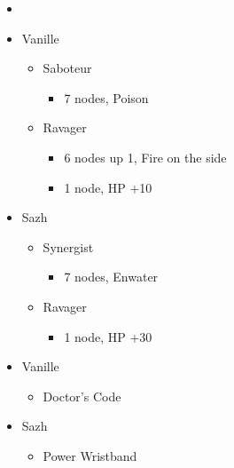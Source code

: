 \begin{menu}
\begin{multicols}{2}
\begin{itemize}
    \paradigm
    \begin{itemize}
        \item {}%
{\paradigmline{\rav}{\com}{}}%
{\paradigmline[2]{\textit{(\sab)}}{\textit{(\syn)}}{}}%
{\paradigmline{\sab}{\syn}{}}%
{\paradigmline{\rav}{\rav}{}}%
{\paradigmline{[\sab]}{(\rav)}{}}%
{\paradigmline{[\sab]}{\com}{}}
    \end{itemize}
    \columnbreak
    \crystarium
    \begin{itemize}
        \item Vanille
        \begin{itemize}
            \item Saboteur
            \begin{itemize}
                \item 7 nodes, Poison
            \end{itemize}
            \item Ravager
            \begin{itemize}
                \item 6 nodes up 1, Fire on the side
                \item 1 node, HP +10
            \end{itemize}
        \end{itemize}
        \item Sazh
        \begin{itemize}
            \item Synergist
            \begin{itemize}
                \item 7 nodes, Enwater
            \end{itemize}
            \item Ravager
            \begin{itemize}
                \item 1 node, HP +30
            \end{itemize}
        \end{itemize}
    \end{itemize}
    \equip
    \begin{itemize}
        \item Vanille
        \begin{itemize}
                \item Doctor's Code
        \end{itemize}
        \item Sazh
        \begin{itemize}
                \item Power Wristband
        \end{itemize}
    \end{itemize}
\end{itemize}
\end{multicols} 
\end{menu}

